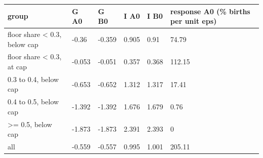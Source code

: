 \begingroup\small
\setlength{\tabcolsep}{3pt}
\renewcommand{\arraystretch}{1.04}
\begin{tabularx}{\linewidth}{XXXXXX}
\toprule
group & G A0 & G B0 & I A0 & I B0 & response A0 (\% births per unit eps) \\
\midrule
floor share \textless{} 0.3, below cap & -0.36 & -0.359 & 0.905 & 0.91 & 74.79 \\
floor share \textless{} 0.3, at cap & -0.053 & -0.051 & 0.357 & 0.368 & 112.15 \\
0.3 to 0.4, below cap & -0.653 & -0.652 & 1.312 & 1.317 & 17.41 \\
0.4 to 0.5, below cap & -1.392 & -1.392 & 1.676 & 1.679 & 0.76 \\
\textgreater{}= 0.5, below cap & -1.873 & -1.873 & 2.391 & 2.393 & 0 \\
all & -0.559 & -0.557 & 0.995 & 1.001 & 205.11 \\
\bottomrule
\end{tabularx}
\endgroup
